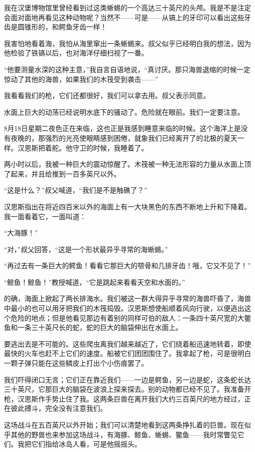 \documentclass[10pt]{book}
\begin{document}
我在汉堡博物馆里曾经看到过这类蜥蜴的一个高达三十英尺的头颅。我是不是注定会面对面地再看见这种动物呢？当然不——可是——从镐上的牙印可以看出这些牙齿是圆锥形的，和鳄鱼牙齿一样！

我害怕地看着海，我怕从海里窜出一条蜥蜴来。叔父似乎已经明白我的想法，因为他检验了铁镐以后，也对海洋仔细扫视了一番。

“他要测量水深的这种主意，”我自言自语地说，“真讨厌。那只海兽退缩的时候一定惊动了其他的海兽，如果我们的木筏受到袭击——”

我看看我们的枪，它们还都很好，我们可以拿去用。叔父表示同意。

水面上巨大的动荡已经说明水底下的骚动了。危险就在眼前。我们一定要注意。

8月18日星期二夜色正在来临，这也正是我感到睡意来临的时候。这个海洋上是没有夜晚的，那强烈的光亮使眼睛感到困倦，就象我们已经离开了的北极的夏天一样。汉恩斯把着舵。他守卫的时候，我睡着了。

两小时以后，我被一种巨大的震动惊醒了。木筏被一种无法形容的力量从水面上顶了起来，并且给推到一百多英尺以外。

“这是什么？”叔父喊道，“我们是不是触礁了？”

汉思斯指出在将近四百米以外的海面上有一大块黑色的东西不断地上升和下降着。我一面看着它，一面叫道：

“大海豚！”

“对，”叔父回答，“这是一个形状最异乎寻常的海蜥蜴。”

“再过去有一条巨大的鳄鱼！看看它那巨大的颚骨和几排牙齿！哦，它又不见了！”

“鲸鱼！鲸鱼！”教授喊道，“它是跳起来看看天空和水面的。”

的确，海面上掀起了两长排海水。我们被这一群大得异乎寻常的海兽吓昏了，海兽中最小的也可以用牙把我们的木筏捣毁。汉恩斯想使船顺着风向行驶，以便逃出这个危险的地点；但是他看见那边有着别的同样可伯的敌人：一条四十英尺宽的大鳖鱼和一条三十英尺长的蛇，蛇的巨大的脑袋伸出在水面上。

要逃出去是不可能的。这些爬虫离我们越来越近了，它们绕着船迅速地转着，即使最快的火车也赶不上它们的速度。船被它们团团围住了。我拿起了枪，可是很明白一颗子弹只能在这些鳞皮上打出个小伤痕罢了。

我们吓得闭口无言；它们正在靠近我们——一边是鳄鱼，另一边是蛇，这条蛇长达三十英尺，它那巨大的脑袋在波浪上探来探去。别的动物都已经不见了。我准备开枪，汉思斯作手势止住了我。这两条巨兽在离开我们大约三百英尺的地方经过，正在彼此搏斗，完全没有注意我们。

这场战斗在五百英尺以外开始；我们可以清楚地看到这两条挣扎着的巨兽。现在似乎其他的野兽也来参加这场战斗，有海豚、鲸鱼、蜥蜴、鳖鱼——我时常瞥见它们。我把它们指给冰岛人看，可是他摇摇头。
\end{document}
